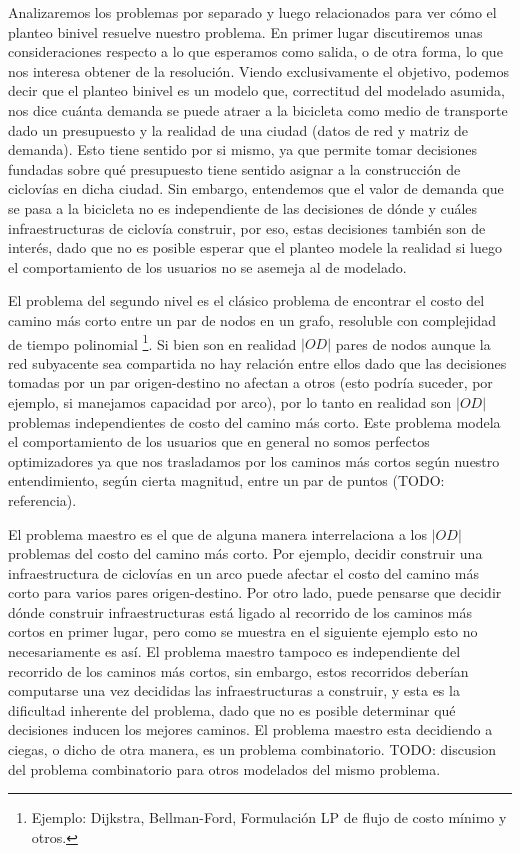 \documentclass{article}
\begin{document}
  Analizaremos los problemas por separado y luego relacionados para ver cómo el planteo binivel resuelve nuestro problema. En primer lugar discutiremos unas consideraciones respecto a lo que esperamos como salida, o de otra forma, lo que nos interesa obtener de la resolución. Viendo exclusivamente el objetivo, podemos decir que el planteo binivel es un modelo que, correctitud del modelado asumida, nos dice cuánta demanda se puede atraer a la bicicleta como medio de transporte dado un presupuesto y la realidad de una ciudad (datos de red y matriz de demanda). Esto tiene sentido por si mismo, ya que permite tomar decisiones fundadas sobre qué presupuesto tiene sentido asignar a la construcción de ciclovías en dicha ciudad. Sin embargo, entendemos que el valor de demanda que se pasa a la bicicleta no es independiente de las decisiones de dónde y cuáles infraestructuras de ciclovía construir, por eso, estas decisiones también son de interés, dado que no es posible esperar que el planteo modele la realidad si luego el comportamiento de los usuarios no se asemeja al de modelado.

  El problema del segundo nivel es el clásico problema de encontrar el costo del camino más corto entre un par de nodos en un grafo, resoluble con complejidad de tiempo polinomial \footnote{Ejemplo: Dijkstra, Bellman-Ford, Formulación LP de flujo de costo mínimo y otros.}. Si bien son en realidad $|OD|$ pares de nodos aunque la red subyacente sea compartida no hay relación entre ellos dado que las decisiones tomadas por un par origen-destino no afectan a otros (esto podría suceder, por ejemplo, si manejamos capacidad por arco), por lo tanto en realidad son $|OD|$ problemas independientes de costo del camino más corto. Este problema modela el comportamiento de los usuarios que en general no somos perfectos optimizadores ya que nos trasladamos por los caminos más cortos según nuestro entendimiento, según cierta magnitud, entre un par de puntos (TODO: referencia).

  El problema maestro es el que de alguna manera interrelaciona a los $|OD|$ problemas del costo del camino más corto. Por ejemplo, decidir construir una infraestructura de ciclovías en un arco puede afectar el costo del camino más corto para varios pares origen-destino. Por otro lado, puede pensarse que decidir dónde construir infraestructuras está ligado al recorrido de los caminos más cortos en primer lugar, pero como se muestra en el siguiente ejemplo esto no necesariamente es así. El problema maestro tampoco es independiente del recorrido de los caminos más cortos, sin embargo, estos recorridos deberían computarse una vez decididas las infraestructuras a construir, y esta es la dificultad inherente del problema, dado que no es posible determinar qué decisiones inducen los mejores caminos. El problema maestro esta decidiendo a ciegas, o dicho de otra manera, es un problema combinatorio. TODO: discusion del problema combinatorio para otros modelados del mismo problema.
\end{document}
